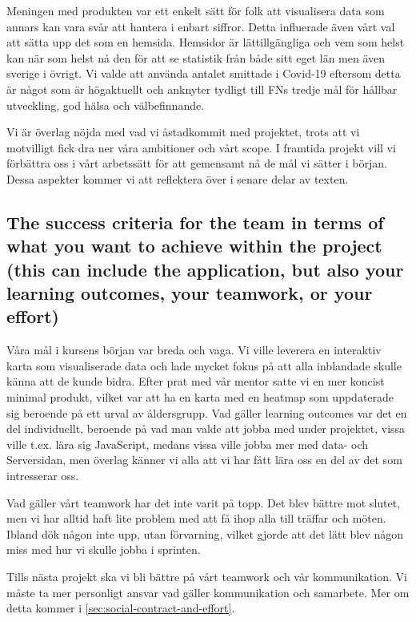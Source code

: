 \documentclass{scrartcl}
\begin{document}
Meningen med produkten var ett enkelt sätt för folk att visualisera data som annars kan vara svår att hantera i enbart siffror. Detta influerade även vårt val att sätta upp det som en hemsida. Hemsidor är lättillgängliga och vem som helst kan när som helst nå den för att se statistik från både sitt eget län men även sverige i övrigt. Vi valde att använda antalet smittade i Covid-19 eftersom detta är något som är högaktuellt och anknyter tydligt till FNs tredje mål för hållbar utveckling, god hälsa och välbefinnande. 

Vi är överlag nöjda med vad vi åstadkommit med projektet, trots att vi motvilligt fick dra ner våra ambitioner och vårt scope. I framtida projekt vill vi förbättra oss i vårt arbetssätt för att gemensamt nå de mål vi sätter i början. Dessa aspekter kommer vi att reflektera över i senare delar av texten.


\subsection{The success criteria for the team in terms of what you want to achieve within the project (this can include the application, but also your learning outcomes, your teamwork, or your effort)}

Våra mål i kursens början var breda och vaga. Vi ville leverera en interaktiv karta som visualiserade data och lade mycket fokus på att alla inblandade skulle känna att de kunde bidra. Efter prat med vår mentor satte vi en mer koncist minimal produkt, vilket var att ha en karta med en heatmap som uppdaterade sig beroende på ett urval av åldersgrupp.  Vad gäller learning outcomes var det en del individuellt, beroende på vad man valde att jobba med under projektet, vissa ville t.ex. lära sig JavaScript, medans vissa ville jobba mer med data- och Serversidan, men överlag känner vi alla att vi har fått lära oss en del av det som intresserar oss. 

Vad gäller vårt teamwork har det inte varit på topp. Det blev bättre mot slutet, men vi har alltid haft lite problem med att få ihop alla till träffar och möten. Ibland dök någon inte upp, utan förvarning, vilket gjorde att det lätt blev någon miss med hur vi skulle jobba i sprinten. 

Tills nästa projekt ska vi bli bättre på vårt teamwork och vår kommunikation. Vi måste ta mer personligt ansvar vad gäller kommunikation och samarbete. Mer om detta kommer i \ref{sec:social-contract-and-effort}.
\end{document}
